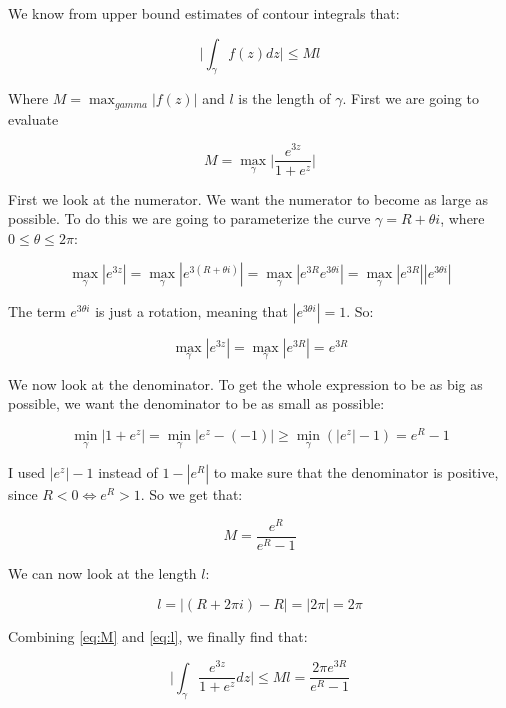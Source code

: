\documentclass[a4paper,norsk, 10pt]{article}
\begin{document}
We know from upper bound estimates of contour integrals that:

$$
\bigg| \int_{\gamma} f(z) dz \bigg| \leq M l 
$$

Where $M = \max_{gamma} |f(z)|$ and $l$ is the length of $\gamma$. First we are going to evaluate

$$
M = \max_{\gamma}\bigg|\frac{e^{3z}}{1+e^z}\bigg|
$$

First we look at the numerator. We want the numerator to become as large as possible. To do this we are going to parameterize the curve $\gamma = R + \theta i$, where $0\leq \theta \leq 2\pi$:

$$
\max_ {\gamma} |e^{3z}| = \max_ {\gamma} |e^{3(R + \theta i)}| = \max_ {\gamma} |e^{3R}e^{3\theta i}|=\max_ {\gamma} |e^{3R}||e^{3\theta i}|
$$

The term $e^{3\theta i}$ is just a rotation, meaning that $|e^{3\theta i}| = 1$. So:

\begin{equation}
\max_ {\gamma} |e^{3z}| = \max_ {\gamma} |e^{3R}| = e^{3R}
\label{eq:maxNum}
\end{equation}

We now look at the denominator. To get the whole expression to be as big as possible, we want the denominator to be as small as possible:

$$
\min_{\gamma} |1+ e^z| = \min_{\gamma}|e^z - (-1)| \geq \min_{\gamma}(|e^z| - 1) = e^R -1
$$

I used $|e^z| - 1$ instead of $1-|e^R|$ to make sure that the denominator is positive, since $R<0 \Leftrightarrow e^R > 1$. So we get that:

\begin{equation}
M = \frac{e^R}{e^R - 1}
\label{eq:M}
\end{equation}

We can now look at the length $l$:

\begin{equation}
l = |(R + 2\pi i) - R | = |2\pi| = 2\pi
\label{eq:l}
\end{equation}

Combining \ref{eq:M} and \ref{eq:l}, we finally find that:

$$
\bigg| \int_{\gamma} \frac{e^{3z}}{1+e^z} dz \bigg| \leq M l = \frac{2\pi e^{3R}}{e^R-1}
$$
\end{document}
